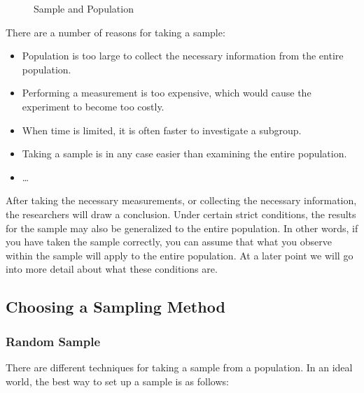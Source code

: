 \begin{figure}
    \begin{center}
    \end{center}
    \caption{Sample and Population}
    \label{img:populatie-steekproef}
\end{figure}

There are a number of reasons for taking a sample:

\begin{itemize}
    \item Population is too large to collect the necessary information from the entire population.
    \item Performing a measurement is too expensive, which would cause the experiment to become too costly.
    \item When time is limited, it is often faster to investigate a subgroup.
    \item Taking a sample is in any case easier than examining the entire population.
    \item \dots
\end{itemize}

After taking the necessary measurements, or collecting the necessary information, the researchers will draw a conclusion. Under certain strict conditions, the results for the sample may also be generalized to the entire population. In other words, if you have taken the sample correctly, you can assume that what you observe within the sample will apply to the entire population. At a later point we will go into more detail about what these conditions are.

\subsection{Choosing a Sampling Method}

\subsubsection{Random Sample}

There are different techniques for taking a sample from a population. In an ideal world, the best way to set up a sample is as follows:

